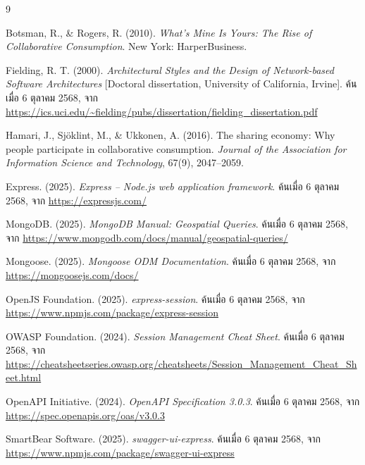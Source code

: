 \documentclass[12pt,a4paper]{report}
\begin{document}
\begin{thebibliography}{9}

Botsman, R., \& Rogers, R. (2010). \textit{What's Mine Is Yours: The Rise of Collaborative Consumption}. New York: HarperBusiness.

Fielding, R. T. (2000). \textit{Architectural Styles and the Design of Network-based Software Architectures} [Doctoral dissertation, University of California, Irvine]. ค้นเมื่อ 6 ตุลาคม 2568, จาก \url{https://ics.uci.edu/~fielding/pubs/dissertation/fielding_dissertation.pdf}

Hamari, J., Sj\"oklint, M., \& Ukkonen, A. (2016). The sharing economy: Why people participate in collaborative consumption. \textit{Journal of the Association for Information Science and Technology}, 67(9), 2047--2059.

Express. (2025). \textit{Express -- Node.js web application framework}. ค้นเมื่อ 6 ตุลาคม 2568, จาก \url{https://expressjs.com/}

MongoDB. (2025). \textit{MongoDB Manual: Geospatial Queries}. ค้นเมื่อ 6 ตุลาคม 2568, จาก \url{https://www.mongodb.com/docs/manual/geospatial-queries/}

Mongoose. (2025). \textit{Mongoose ODM Documentation}. ค้นเมื่อ 6 ตุลาคม 2568, จาก \url{https://mongoosejs.com/docs/}

OpenJS Foundation. (2025). \textit{express-session}. ค้นเมื่อ 6 ตุลาคม 2568, จาก \url{https://www.npmjs.com/package/express-session}

OWASP Foundation. (2024). \textit{Session Management Cheat Sheet}. ค้นเมื่อ 6 ตุลาคม 2568, จาก \url{https://cheatsheetseries.owasp.org/cheatsheets/Session\_Management\_Cheat\_Sheet.html}

OpenAPI Initiative. (2024). \textit{OpenAPI Specification 3.0.3}. ค้นเมื่อ 6 ตุลาคม 2568, จาก \url{https://spec.openapis.org/oas/v3.0.3}

SmartBear Software. (2025). \textit{swagger-ui-express}. ค้นเมื่อ 6 ตุลาคม 2568, จาก \url{https://www.npmjs.com/package/swagger-ui-express}

\end{thebibliography}
\end{document}
